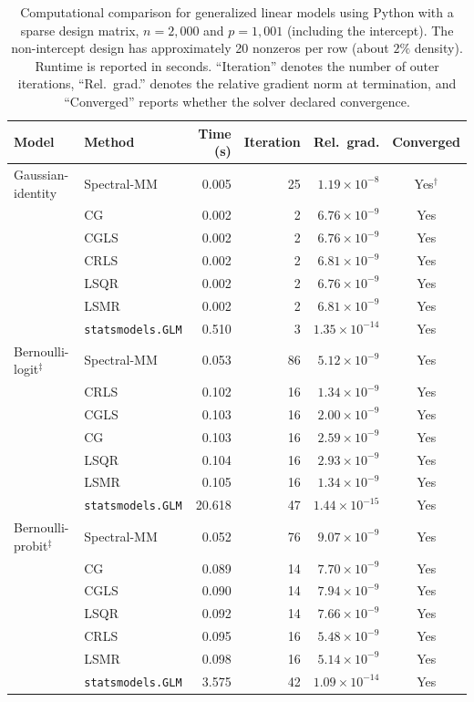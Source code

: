 \clearpage

\begin{table}[htbp]
\centering
\small
\setlength{\tabcolsep}{4pt}
\caption{
Computational comparison for generalized linear models using Python with a sparse design matrix,
$n=2{,}000$ and $p=1{,}001$ (including the intercept).
The non-intercept design has approximately 20 nonzeros per row (about $2\%$ density).
Runtime is reported in seconds. ``Iteration\textquotedblright{} denotes the number of outer iterations,
``Rel.\ grad.\textquotedblright{} denotes the relative gradient norm at termination, and
``Converged\textquotedblright{} reports whether the solver declared convergence.}
\label{tab:python-glm-comparison-sparse}
\begin{tabular}{llrrrc}
\toprule
Model & Method & Time (s) & Iteration & Rel.\ grad. & Converged \\
\midrule

Gaussian-identity
& Spectral-MM & 0.005 & 25 & $1.19\times10^{-8}$ & Yes$^{\dagger}$ \\
& CG & 0.002 & 2 & $6.76\times10^{-9}$ & Yes \\
& CGLS & 0.002 & 2 & $6.76\times10^{-9}$ & Yes \\
& CRLS & 0.002 & 2 & $6.81\times10^{-9}$ & Yes \\
& LSQR & 0.002 & 2 & $6.76\times10^{-9}$ & Yes \\
& LSMR & 0.002 & 2 & $6.81\times10^{-9}$ & Yes \\
& \texttt{statsmodels.GLM} & 0.510 & 3 & $1.35\times10^{-14}$ & Yes \\
\midrule

Bernoulli-logit$^{\ddagger}$
& Spectral-MM & 0.053 & 86 & $5.12\times10^{-9}$ & Yes \\
& CRLS & 0.102 & 16 & $1.34\times10^{-9}$ & Yes \\
& CGLS & 0.103 & 16 & $2.00\times10^{-9}$ & Yes \\
& CG & 0.103 & 16 & $2.59\times10^{-9}$ & Yes \\
& LSQR & 0.104 & 16 & $2.93\times10^{-9}$ & Yes \\
& LSMR & 0.105 & 16 & $1.34\times10^{-9}$ & Yes \\
& \texttt{statsmodels.GLM} & 20.618 & 47 & $1.44\times10^{-15}$ & Yes \\
\midrule

Bernoulli-probit$^{\ddagger}$
& Spectral-MM & 0.052 & 76 & $9.07\times10^{-9}$ & Yes \\
& CG & 0.089 & 14 & $7.70\times10^{-9}$ & Yes \\
& CGLS & 0.090 & 14 & $7.94\times10^{-9}$ & Yes \\
& LSQR & 0.092 & 14 & $7.66\times10^{-9}$ & Yes \\
& CRLS & 0.095 & 16 & $5.48\times10^{-9}$ & Yes \\
& LSMR & 0.098 & 16 & $5.14\times10^{-9}$ & Yes \\
& \texttt{statsmodels.GLM} & 3.575 & 42 & $1.09\times10^{-14}$ & Yes \\
\midrule


\end{tabular}
\end{table}
